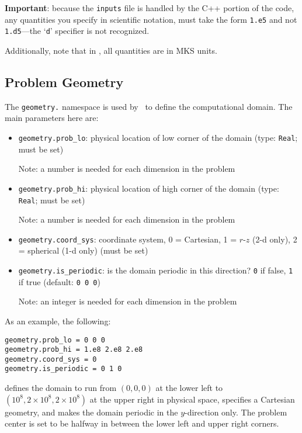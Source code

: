 {\bf Important}: because the {\tt inputs} file is handled by the C++ portion of
the code, any quantities you specify in scientific notation, must take the
form {\tt 1.e5} and not {\tt 1.d5}---the `{\tt d}' specifier is not recognized.

Additionally, note that in \pelelm, all quantities are in MKS units.

\subsection{Problem Geometry}

The {\tt geometry.} namespace is used by \amrex\ to define the
computational domain.  The main parameters here are:
\begin{itemize}
\item {\tt geometry.prob\_lo}: physical location of low corner of the
domain (type: {\tt Real}; must be set)

  Note: a number is needed for each dimension in the problem
  
\item {\tt geometry.prob\_hi}: physical location of high corner of the
domain (type: {\tt Real}; must be set)

  Note: a number is needed for each dimension in the problem
  
\item {\tt geometry.coord\_sys}: coordinate system, 0 = Cartesian,
1 = $r$-$z$ (2-d only), 2 = spherical (1-d only) (must be set)

\item {\tt geometry.is\_periodic}: is the domain periodic in this direction?
  {\tt 0} if false, {\tt 1} if true  (default: {\tt 0 0 0}) 

  Note: an integer is needed for each dimension in the problem

\end{itemize}

As an example, the following:
\begin{lstlisting}
geometry.prob_lo = 0 0 0
geometry.prob_hi = 1.e8 2.e8 2.e8 
geometry.coord_sys = 0 
geometry.is_periodic = 0 1 0 
\end{lstlisting}
defines the domain to run from $(0,0,0)$ at the lower left to
$(10^8,2\times 10^8,2\times 10^8)$ at the upper right in physical space, specifies a
Cartesian geometry, and makes the domain periodic in the $y$-direction
only. The problem center is set to be halfway in between the lower left and 
upper right corners.


